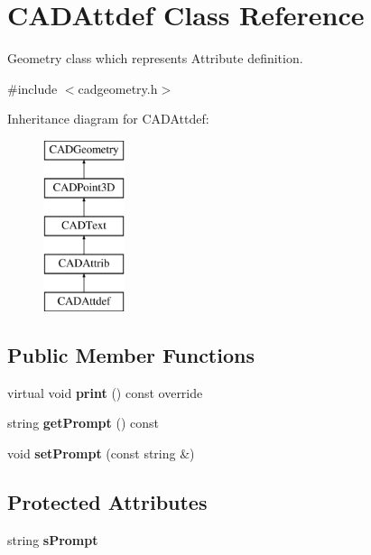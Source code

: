 \hypertarget{class_c_a_d_attdef}{}\section{C\+A\+D\+Attdef Class Reference}
\label{class_c_a_d_attdef}


Geometry class which represents Attribute definition.  




{\ttfamily \#include $<$cadgeometry.\+h$>$}

Inheritance diagram for C\+A\+D\+Attdef\+:\begin{figure}[H]
\begin{center}
\leavevmode
\includegraphics[height=5.000000cm]{class_c_a_d_attdef}
\end{center}
\end{figure}
\subsection*{Public Member Functions}
\begin{DoxyCompactItemize}
\item 
virtual void {\bfseries print} () const  override\hypertarget{class_c_a_d_attdef_afda633f92e0cf0cbbc30fe7cdb21457e}{}\label{class_c_a_d_attdef_afda633f92e0cf0cbbc30fe7cdb21457e}

\item 
string {\bfseries get\+Prompt} () const \hypertarget{class_c_a_d_attdef_ac862ce2b130777db87b861f7bf80e530}{}\label{class_c_a_d_attdef_ac862ce2b130777db87b861f7bf80e530}

\item 
void {\bfseries set\+Prompt} (const string \&)\hypertarget{class_c_a_d_attdef_ab8597b99e32dcb8b4e9c9436ee104219}{}\label{class_c_a_d_attdef_ab8597b99e32dcb8b4e9c9436ee104219}

\end{DoxyCompactItemize}
\subsection*{Protected Attributes}
\begin{DoxyCompactItemize}
\item 
string {\bfseries s\+Prompt}\hypertarget{class_c_a_d_attdef_aceae65be743858330a8b8d765935d16b}{}\label{class_c_a_d_attdef_aceae65be743858330a8b8d765935d16b}

\end{DoxyCompactItemize}
